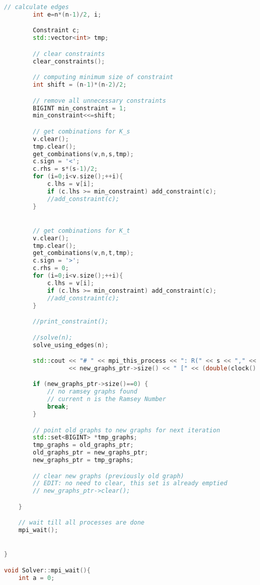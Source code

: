 \documentclass[12pt]{etsu_thesis}
\begin{document}
\begin{lstlisting}[language=C++]
        // calculate edges
        int e=n*(n-1)/2, i;

        Constraint c;
        std::vector<int> tmp;

        // clear constraints
        clear_constraints();

        // computing minimum size of constraint
        int shift = (n-1)*(n-2)/2;

        // remove all unnecessary constraints
        BIGINT min_constraint = 1;
        min_constraint<<=shift;

        // get combinations for K_s 
        v.clear();
        tmp.clear();    
        get_combinations(v,n,s,tmp);
        c.sign = '<';
        c.rhs = s*(s-1)/2;        
        for (i=0;i<v.size();++i){
            c.lhs = v[i];
            if (c.lhs >= min_constraint) add_constraint(c);
            //add_constraint(c);
        }


        // get combinations for K_t 
        v.clear();
        tmp.clear();
        get_combinations(v,n,t,tmp);
        c.sign = '>';
        c.rhs = 0;
        for (i=0;i<v.size();++i){
            c.lhs = v[i];
            if (c.lhs >= min_constraint) add_constraint(c);
            //add_constraint(c);
        }

        //print_constraint();

        //solve(n);
        solve_using_edges(n);

        std::cout << "# " << mpi_this_process << ": R(" << s << "," << t << "," << n << ") = " 
                  << new_graphs_ptr->size() << " [" << (double(clock() - begin) / CLOCKS_PER_SEC) << "s]" << std::endl;

        if (new_graphs_ptr->size()==0) {
            // no ramsey graphs found
            // current n is the Ramsey Number
            break;
        }

        // point old graphs to new graphs for next iteration
        std::set<BIGINT> *tmp_graphs;
        tmp_graphs = old_graphs_ptr;
        old_graphs_ptr = new_graphs_ptr;
        new_graphs_ptr = tmp_graphs;

        // clear new graphs (previously old graph)
        // EDIT: no need to clear, this set is already emptied
        // new_graphs_ptr->clear();

    }

    // wait till all processes are done
    mpi_wait();


}

void Solver::mpi_wait(){
    int a = 0;


\end{lstlisting}
\end{document}
